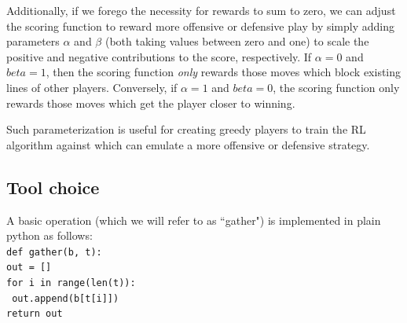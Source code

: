 \documentclass[12pt,a4paper]{article}
\begin{document}
Additionally, if we forego the necessity for rewards to sum to zero, we can adjust the scoring function to reward more offensive or defensive play by simply adding parameters $\alpha$ and $\beta$ (both taking values between zero and one) to scale the positive and negative contributions to the score, respectively. If $\alpha=0$ and $beta=1$, then the scoring function \textit{only} rewards those moves which block existing lines of other players. Conversely, if $\alpha=1$ and $beta=0$, the scoring function only rewards those moves which get the player closer to winning.

Such parameterization is useful for creating greedy players to train the RL algorithm against which can emulate a more offensive or defensive strategy.
\subsection{Tool choice}

A basic operation (which we will refer to as ``gather") is implemented in plain python as follows:\\
\indent\texttt{def gather(b, t):}\\
\indent\indent \texttt{out = []}\\
\indent\indent \texttt{for i in range(len(t)):}\\
\indent\indent \indent \texttt{   out.append(b[t[i]])}\\
\indent\indent \texttt{return out}\\
\end{document}
